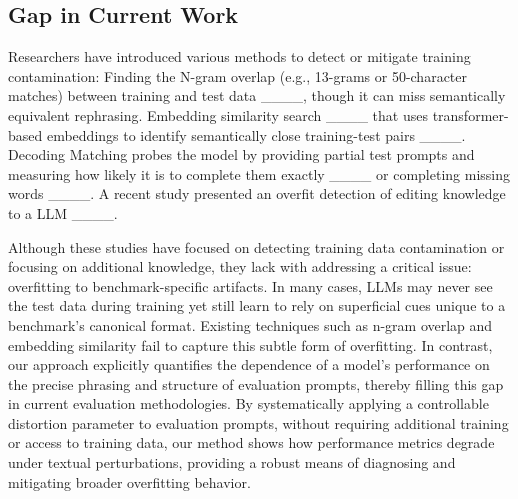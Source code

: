 \subsection{Gap in Current Work}
Researchers have introduced various methods to detect or mitigate training contamination: Finding the N-gram overlap  (e.g., 13-grams or 50-character matches) between training and test data ____, though it can miss semantically equivalent rephrasing.
Embedding similarity search ____ that uses transformer-based embeddings to identify semantically close training-test pairs ____. Decoding Matching probes the model by providing partial test prompts and measuring how likely it is to complete them exactly ____ or completing missing words ____. A recent study presented an overfit detection of editing knowledge to a LLM ____. 

Although these studies have focused on detecting training data contamination or focusing on additional knowledge, they lack with addressing a critical issue: overfitting to benchmark-specific artifacts. In many cases, LLMs may never see the test data during training yet still learn to rely on superficial cues unique to a benchmark's canonical format. Existing techniques such as n-gram overlap and embedding similarity fail to capture this subtle form of overfitting. In contrast, our approach explicitly quantifies the dependence of a model's performance on the precise phrasing and structure of evaluation prompts, thereby filling this gap in current evaluation methodologies. By systematically applying a controllable distortion parameter to evaluation prompts, without requiring additional training or access to training data, our method shows how performance metrics degrade under textual perturbations, providing a robust means of diagnosing and mitigating broader overfitting behavior.
